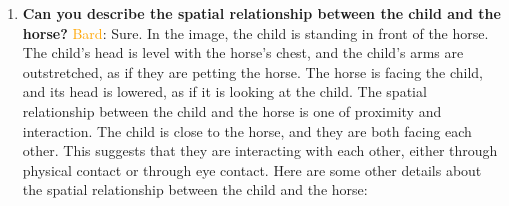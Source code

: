     \begin{enumerate}
        \item \textbf{Can you describe the spatial relationship between the child and the horse?}
        \subitem \textcolor{orange}{Bard}:
        Sure. In the image, the child is standing in front of the horse. The child's head is level with the horse's chest, and the child's arms are outstretched, as if they are petting the horse. The horse is facing the child, and its head is lowered, as if it is looking at the child. The spatial relationship between the child and the horse is one of proximity and interaction. The child is close to the horse, and they are both facing each other. This suggests that they are interacting with each other, either through physical contact or through eye contact.
        Here are some other details about the spatial relationship between the child and the horse:


\end{enumerate}
